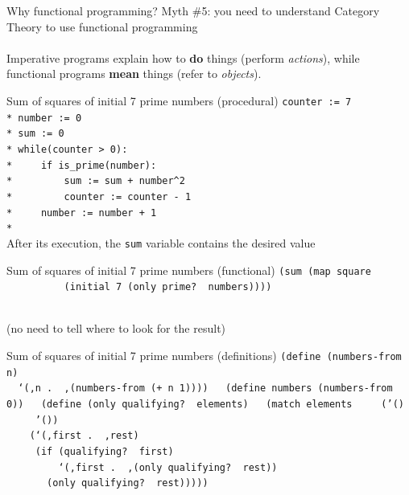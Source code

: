 \documentclass{beamer}
\begin{document}
\begin{frame}{Why functional programming?} \pause
  Myth \#5: you need to understand Category Theory to use
  functional programming \\ \pause
  \ \\
  {\large Imperative programs explain how to \textbf{do} things
  (perform \textit{actions}), while
  functional programs \textbf{mean} things (refer to \textit{objects}).}
  
\end{frame}

\begin{frame}{Sum of squares of initial 7 prime numbers (procedural)} \pause
  \texttt{counter := 7\\* \pause
number := 0\\* \pause
sum := 0\\* \pause
while(counter > 0):\\* \pause
\ \ \ \ if is\_prime(number):\\* \pause
\ \ \ \ \ \ \ \ sum := sum + number\^{}2\\* \pause
\ \ \ \ \ \ \ \ counter := counter - 1\\* \pause
\ \ \ \ number := number + 1\\* 
  } \ \\ \pause
  After its execution, the \texttt{sum} variable contains the
  desired value
\end{frame}

\begin{frame}{Sum of squares of initial 7 prime numbers (functional)} \pause
  \texttt{(sum (map square \\
    \ \ \ \ \ \ \ \ \ \ (initial 7 (only prime?\,\,numbers))))} \\ \ \\ \pause
  \begin{center}
    {\footnotesize (no need to tell where to look for the result)}
  \end{center}
\end{frame}

\begin{frame}{Sum of squares of initial 7 prime numbers (definitions)} \pause
  \texttt{(define (numbers-from n)\\
    \ \ `(,n .\,\,,(numbers-from (+ n 1))))\\
    \ \\ \pause
    (define numbers (numbers-from 0))\\
    \ \\ \pause
    (define (only qualifying?\,\,elements)\\ \pause
    \ \ (match elements\\ \pause
    \ \ \ \ ('()\\
    \ \ \ \ \ '())\\ \pause
    \ \ \ \ (`(,first .\,\,,rest)\\ \pause
    \ \ \ \ \ (if (qualifying?\,\,first)\\
    \ \ \ \ \ \ \ \ \ `(,first .\,\,,(only qualifying?\,\,rest))\\ \pause
    \ \ \ \ \ \ \ (only qualifying?\,\,rest)))))\\
    }    
\end{frame}
\end{document}
